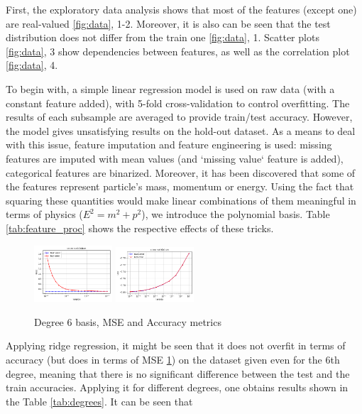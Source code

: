 \documentclass[10pt,conference,compsocconf]{IEEEtran}
\begin{document}
First, the exploratory data analysis shows that most of the features (except one) are real-valued \ref{fig:data}, 1-2. Moreover, it is also can be seen that the test distribution does not differ from the train one \ref{fig:data}, 1. Scatter plots \ref{fig:data}, 3 show dependencies between features, as well as the correlation plot \ref{fig:data}, 4.

To begin with, a simple linear regression model is used on raw data (with a constant feature added), with 5-fold cross-validation to control overfitting. The results of each subsample are averaged to provide train/test accuracy. However, the model gives unsatisfying results on the hold-out dataset. As a means to deal with this issue, feature imputation and feature engineering is used: missing features are imputed with mean values (and `missing value` feature is added), categorical features are binarized. Moreover, it has been discovered that some of the features represent particle's mass, momentum or energy. Using the fact that squaring these quantities would make linear combinations of them meaningful in terms of physics ($E^2=m^2+p^2$), we introduce the polynomial basis. Table \ref{tab:feature_proc} shows the respective effects of these tricks.

\begin{figure}[!htb]
	\centering \includegraphics[width=110px]{linear_5}
	\centering \includegraphics[width=110px]{ridge_accuracy_deg6}
	\caption{Degree 6 basis, MSE and Accuracy metrics}
	\label{fig:deg6}
\end{figure}

Applying ridge regression, it might be seen that it does not overfit in terms of accuracy (but does in terms of MSE \ref{fig:deg6}) on the dataset given even for the 6th degree, meaning that there is no significant difference between the test and the train accuracies. Applying it for different degrees, one obtains results shown in the Table \ref{tab:degrees}. It can be seen that 
\end{document}
